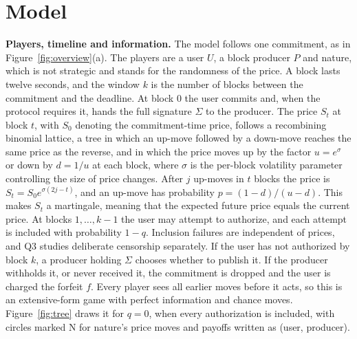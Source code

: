 \documentclass[11pt]{article}
\begin{document}
\section{Model}\label{sec:model}
\textbf{Players, timeline and information.} The model follows one commitment, as in Figure~\ref{fig:overview}(a). The players are a user $U$, a block producer $P$ and nature, which is not strategic and stands for the randomness of the price. A block lasts twelve seconds, and the window $k$ is the number of blocks between the commitment and the deadline. At block $0$ the user commits and, when the protocol requires it, hands the full signature $\Sigma$ to the producer. The price $S_t$ at block $t$, with $S_0$ denoting the commitment-time price, follows a recombining binomial lattice, a tree in which an up-move followed by a down-move reaches the same price as the reverse, and in which the price moves up by the factor $u=e^{\sigma}$ or down by $d=1/u$ at each block, where $\sigma$ is the per-block volatility parameter controlling the size of price changes. After $j$ up-moves in $t$ blocks the price is $S_t=S_0e^{\sigma(2j-t)}$, and an up-move has probability $p=(1-d)/(u-d)$. This makes $S_t$ a martingale, meaning that the expected future price equals the current price. At blocks $1,\dots,k-1$ the user may attempt to authorize, and each attempt is included with probability $1-q$. Inclusion failures are independent of prices, and Q3 studies deliberate censorship separately. If the user has not authorized by block $k$, a producer holding $\Sigma$ chooses whether to publish it. If the producer withholds it, or never received it, the commitment is dropped and the user is charged the forfeit $f$. Every player sees all earlier moves before it acts, so this is an extensive-form game with perfect information and chance moves. Figure~\ref{fig:tree} draws it for $q=0$, when every authorization is included, with circles marked N for nature's price moves and payoffs written as (user, producer).
\end{document}
